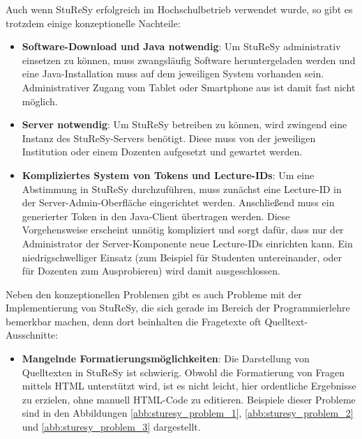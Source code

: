 Auch wenn StuReSy erfolgreich im Hochschulbetrieb verwendet wurde, so gibt es trotzdem einige konzeptionelle Nachteile:
\begin{itemize}
    \item \textbf{Software-Download und Java notwendig}: Um StuReSy administrativ einsetzen zu können, muss zwangsläufig Software heruntergeladen werden und eine Java-Installation muss auf dem jeweiligen System vorhanden sein. Administrativer Zugang vom Tablet oder Smartphone aus ist damit fast nicht möglich.
    \item \textbf{Server notwendig}: Um StuReSy betreiben zu können, wird zwingend eine Instanz des StuReSy-Servers benötigt. Diese muss von der jeweiligen Institution oder einem Dozenten aufgesetzt und gewartet werden.
    \item \textbf{Kompliziertes System von Tokens und Lecture-IDs}: Um eine Abstimmung in StuReSy durchzuführen, muss zunächst eine Lecture-ID in der Server-Admin-Oberfläche eingerichtet werden. Anschließend muss ein generierter Token in den Java-Client übertragen werden. Diese Vorgehensweise erscheint unnötig kompliziert und sorgt dafür, dass nur der Administrator der Server-Komponente neue Lecture-IDs einrichten kann. Ein niedrigschwelliger Einsatz (zum Beispiel für Studenten untereinander, oder für Dozenten zum Ausprobieren) wird damit ausgeschlossen.
\end{itemize}

Neben den konzeptionellen Problemen gibt es auch Probleme mit der Implementierung von StuReSy, die sich gerade im Bereich der Programmierlehre bemerkbar machen, denn dort beinhalten die Fragetexte oft Quelltext-Ausschnitte:
\begin{itemize}
\item \textbf{Mangelnde Formatierungsmöglichkeiten}: Die Darstellung von Quelltexten in StuReSy ist schwierig. Obwohl die Formatierung von Fragen mittels HTML unterstützt wird, ist es nicht leicht, hier ordentliche Ergebnisse zu erzielen, ohne manuell HTML-Code zu editieren. Beispiele dieser Probleme sind in den Abbildungen \ref{abb:sturesy_problem_1}, \ref{abb:sturesy_problem_2} und \ref{abb:sturesy_problem_3} dargestellt.
\end{itemize}

